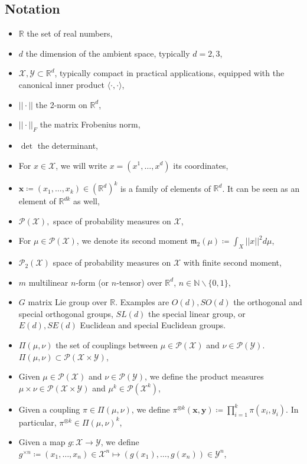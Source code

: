 \documentclass{article}
\newcommand{\N}{\mathbb{N}}
\newcommand{\R}{\mathbb{R}}
\newcommand{\Y}{\mathcal{Y}}
\newcommand{\X}{\mathcal{X}}
\newcommand{\1}{\mathbf{1}}
\renewcommand{\P}{\mathcal{P}}
\theoremstyle{definition}
\theoremstyle{remark}
\begin{document}
\begin{appendices}
\section*{Notation}
\begin{itemize}
    \item $\R$ the set of real numbers,
    \item $d$  the dimension of the ambient space, typically $d=2,3$,
    \item $\X,\Y\subset \R^d$, typically compact in practical applications, equipped with the canonical inner product $\langle\cdot,\cdot\rangle$,
    \item $||\cdot||$ the 2-norm on $\R^d$, 
    \item $||\cdot||_F$ the matrix Frobenius norm,
    \item $\det$ the determinant,
    \item For $x\in\X$, we will write $x=(x^1,\dots,x^d)$ its coordinates,
    \item $\mathbf{x}\coloneqq (x_1,\dots,x_k)\in (\R^d)^k$ is a family of elements of $\R^d$. It can be seen as an element of $\R^{dk}$ as well,
    \item $\P(\X), $ space of probability measures on $\X$,
    \item For $\mu \in \P(\X)$, we denote its second moment $\mathfrak{m}_2(\mu)\coloneqq\int_X ||x||^2d\mu$, 
    \item $\P_2(\X)$ space of probability measures on $\X$ with finite second moment,
    \item $m$ multilinear $n$-form (or $n$-tensor) over $\R^d$, $n\in \N\backslash\{0,1\}$,
    \item $G$ matrix Lie group over $\R$. Examples are $O(d), SO(d)$ the orthogonal and special orthogonal groups, $SL(d)$ the special linear group,  or $E(d), SE(d)$ Euclidean and special Euclidean groups. 
    \item $\Pi(\mu,\nu)$ the set of couplings between $\mu\in\P(\X)$ and $\nu\in\P(\Y)$. $\Pi(\mu,\nu)\subset\P(\X\times\Y)$,
    \item Given $\mu\in\P(\X)$ and $\nu\in\P(\Y)$, we define the product measures $\mu\times\nu\in \P(\X\times \Y)$ and $\mu^k\in \P(\X^k)$,
    \item Given a coupling $\pi\in\Pi(\mu,\nu)$, we define $\pi^{\otimes k}(\mathbf{x},\mathbf{y})\coloneqq \prod_{i=1}^k\pi(x_i,y_i)$. In particular, $\pi^{\otimes k}\in\Pi(\mu,\nu)^k$,
    \item Given a map $g:\X\to\Y$, we define $g^{\times n}\coloneqq (x_1,\dots, x_n)\in \X^n\mapsto (g(x_1),\dots, g(x_n))\in \Y^n$,

\end{itemize}
\end{appendices}
\end{document}

